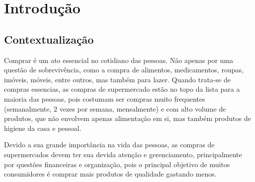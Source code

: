 \chapter{Introdução}

\label{sec:contextualizao}
\section{Contextualização}
Comprar é um ato essencial no cotidiano das pessoas. Não apenas por uma questão de sobrevivência, como a compra de alimentos,
medicamentos, roupas, imóveis, móveis, entre outros, mas também para lazer. Quando trata-se de compras essencias, as compras de supermercado estão no topo da lista para a maioria das pessoas, pois costumam ser compras muito frequentes (semanalmente, 2 vezes por semana, mensalmente) e com alto volume de produtos, que não envolvem apenas alimentação em si, mas também produtos de higiene da casa e pessoal.

Devido a sua grande importância na vida das pessoas, as compras de supermercados devem ter sua devida atenção e gerenciamento, principalmente por questões financeiras e organização, pois o principal objetivo de muitos consumidores é comprar mais produtos de qualidade gastando menos.

\label{sec:problematizacao}

